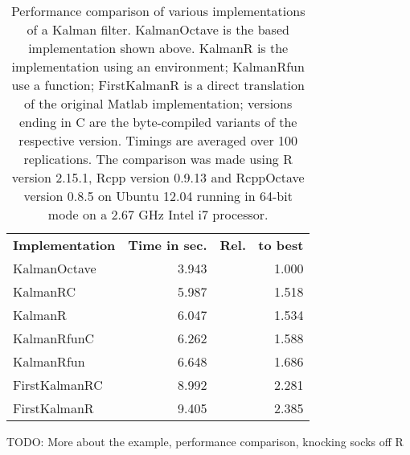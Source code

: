 
\begin{table}[hbt]
  \begin{center}
    \begin{small}
      \begin{tabular}{lrr}
        \toprule
        {\bf Implementation \phantom{XX}} & {\bf Time in sec.} & {\bf Rel.~ to best} \\
        \cmidrule(r){1-3}
         KalmanOctave  & 3.943 & 1.000 \\
             KalmanRC  & 5.987 & 1.518 \\
              KalmanR  & 6.047 & 1.534 \\
          KalmanRfunC  & 6.262 & 1.588 \\
           KalmanRfun  & 6.648 & 1.686 \\
        FirstKalmanRC  & 8.992 & 2.281 \\
         FirstKalmanR  & 9.405 & 2.385 \\
        \bottomrule
      \end{tabular}
      \caption{Performance comparison of various implementations of a Kalman filter.
        KalmanOctave is the  based implementation shown above.
        KalmanR is the \R implementation using an environment; KalmanRfun use a
        function; FirstKalmanR is a direct translation of the original Matlab
        implementation; versions ending in C are the byte-compiled variants of
        the respective version.  Timings are averaged over 100 replications.
        The comparison was made using R version 2.15.1, Rcpp version 0.9.13 and
        RcppOctave version 0.8.5 on Ubuntu 12.04 running in 64-bit mode on a
        2.67 GHz Intel i7 processor.}
      \label{tab:benchmark}
    \end{small}
  \end{center}
\end{table}


TODO: More about the example, performance comparison, knocking socks off R


